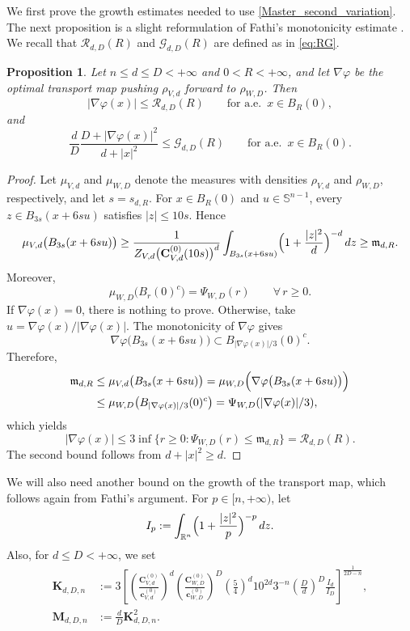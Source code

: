 \documentclass[11pt,a4paper,reqno]{amsart}
\numberwithin{equation}{section}
\newtheorem{proposition}[theorem]{Proposition}
\theoremstyle{definition}
\newcommand{\<}{\ensuremath \leq}
\renewcommand{\>}{\ensuremath \geq}
\newcommand{\Znorm}[2]{Z_{#1,#2}}
\newcommand{\CVp}[1]{\mathbf{C}_{V,#1}}
\newcommand{\CWp}[1]{\mathbf{C}_{W,#1}}
\newcommand{\cVp}[1]{\mathbf{c}_{V,#1}}
\newcommand{\cWp}[1]{\mathbf{c}_{W,#1}}
\begin{document}
We first prove the growth estimates needed to use \cref{Master_second_variation}. 
The next proposition is a slight reformulation of Fathi's monotonicity estimate \cite[Theorem 2.3]{Fathi}. We recall that $\mathcal R_{d,D}(R)$ and $\mathcal G_{d,D}(R)$ are defined as in  
\eqref{eq:RG}.

\begin{proposition}\label{Local_D_growth}
Let $n\le d\le D<+\infty$ and $0<R<+\infty$, and let $\nabla\varphi$ be the optimal transport map pushing $\rho_{V,d}$ forward to $\rho_{W,D}$. 
Then
\[
    |\nabla\varphi(x)|\le \mathcal R_{d,D}(R)
    \qquad \text{for a.e. }\, x\in B_R(0),
\]
and
\[
    \frac{d}{D}\frac{D+|\nabla\varphi(x)|^2}{d+|x|^2}
    \le
    \mathcal G_{d,D}(R)
    \qquad \text{for a.e. }\, x\in B_R(0).
\]
\end{proposition}

\begin{proof}
Let $\mu_{V,d}$ and $\mu_{W,D}$ denote the measures with densities $\rho_{V,d}$ and $\rho_{W,D}$, respectively, and let $s=s_{d,R}$. For $x\in B_R(0)$ and $u\in\mathbb{S}^{n-1}$, every $z\in B_{3s}(x+6su)$ satisfies $|z|\le10s$. Hence
\[
\mu_{V,d}\bigl(B_{3s}(x+6su)\bigr)
\ge
\frac{1}{\Znorm{V}{d}\bigl(\CVp{d}^{(0)}(10s)\bigr)^d}
\int_{B_{3s}(x+6su)}
\Bigl(1+\frac{|z|^2}{d}\Bigr)^{-d}\,dz \ge \mathfrak m_{d,R}.
\]
Moreover,
\[
    \mu_{W,D}\bigl(B_r(0)^c\bigr)= \Psi_{W,D}(r)
    \qquad \forall\, r\ge0.
\]
If $\nabla\varphi(x)=0$, there is nothing to prove. Otherwise, take $u=\nabla\varphi(x)/|\nabla\varphi(x)|$. The monotonicity of $\nabla\varphi$ gives
\[
    \nabla\varphi\bigl(B_{3s}(x+6su)\bigr)
    \subset B_{|\nabla\varphi(x)|/3}(0)^c.
\]
Therefore,
\[
\begin{aligned}
    \mathfrak m_{d,R}
    &\le
    \mu_{V,d}\bigl(B_{3s}(x+6su)\bigr)=
    \mu_{W,D}\Bigl(\nabla\varphi\bigl(B_{3s}(x+6su)\bigr)\Bigr)\\
    &\le
    \mu_{W,D}\bigl(B_{|\nabla\varphi(x)|/3}(0)^c\bigr)
    =
    \Psi_{W,D}(|\nabla\varphi(x)|/3),
\end{aligned}
\]
which yields
\[
    |\nabla\varphi(x)|\le
    3\inf\{r\ge0:\Psi_{W,D}(r)\le \mathfrak m_{d,R}\}
    =
    \mathcal R_{d,D}(R).
\]
The second bound follows from $d+|x|^2\ge d$.
\end{proof}


We will also need another bound on the growth of the transport map, which follows again from Fathi's argument.
For $p\in[n,+\infty)$, let
\[
    I_p:=\int_{\mathbb{R}^n}\Bigl(1+\frac{|z|^2}{p}\Bigr)^{-p}\,dz.
\]
Also, for $d\le D<+\infty$, we set
\begin{equation}\label{Finite_growth_constants}
\begin{aligned}
\mathbf{K}_{d,D,n}
&:=
3\left[
\left(\frac{\CVp{d}^{(0)}}{\cVp{d}^{(0)}}\right)^d
\left(\frac{\CWp{D}^{(0)}}{\cWp{D}^{(0)}}\right)^D
\left(\frac{5}{4}\right)^d10^{2d}3^{-n}
\left(\frac{D}{d}\right)^D
\frac{I_d}{I_D}
\right]^{\frac{1}{2D-n}},\\
\mathbf{M}_{d,D,n}
&:=
\frac{d}{D}\mathbf{K}_{d,D,n}^2.
\end{aligned}
\end{equation}
\end{document}
